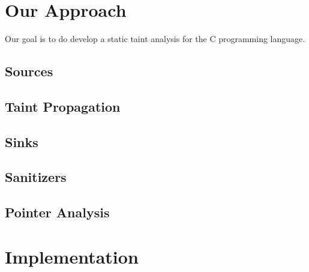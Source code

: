 \section{Our Approach}

Our goal is to do develop a static taint analysis for
the C programming language.

\subsection{Sources}\label{analysis:sources}

\subsection{Taint Propagation}\label{analysis:propagation}

\subsection{Sinks}\label{analysis:sinks}

\subsection{Sanitizers}\label{analysis:sanitizers}

\subsection{Pointer Analysis}\label{analysis:pointers}

\section{Implementation}